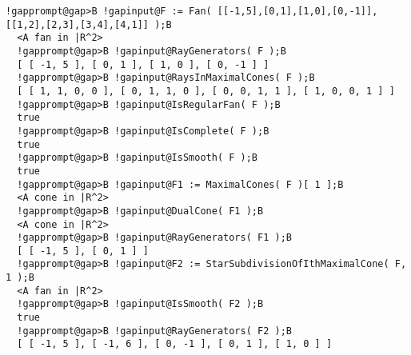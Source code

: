 \documentclass[a4paper,11pt]{report}
\begin{document}
{{{\begin{Verbatim}[commandchars=!@B,fontsize=\small,frame=single,label=Example]
  !gapprompt@gap>B !gapinput@F := Fan( [[-1,5],[0,1],[1,0],[0,-1]],[[1,2],[2,3],[3,4],[4,1]] );B
  <A fan in |R^2>
  !gapprompt@gap>B !gapinput@RayGenerators( F );B
  [ [ -1, 5 ], [ 0, 1 ], [ 1, 0 ], [ 0, -1 ] ]
  !gapprompt@gap>B !gapinput@RaysInMaximalCones( F );B
  [ [ 1, 1, 0, 0 ], [ 0, 1, 1, 0 ], [ 0, 0, 1, 1 ], [ 1, 0, 0, 1 ] ]
  !gapprompt@gap>B !gapinput@IsRegularFan( F );B
  true
  !gapprompt@gap>B !gapinput@IsComplete( F );B
  true
  !gapprompt@gap>B !gapinput@IsSmooth( F );B
  true
  !gapprompt@gap>B !gapinput@F1 := MaximalCones( F )[ 1 ];B
  <A cone in |R^2>
  !gapprompt@gap>B !gapinput@DualCone( F1 );B
  <A cone in |R^2>
  !gapprompt@gap>B !gapinput@RayGenerators( F1 );B
  [ [ -1, 5 ], [ 0, 1 ] ]
  !gapprompt@gap>B !gapinput@F2 := StarSubdivisionOfIthMaximalCone( F, 1 );B
  <A fan in |R^2>
  !gapprompt@gap>B !gapinput@IsSmooth( F2 );B
  true
  !gapprompt@gap>B !gapinput@RayGenerators( F2 );B
  [ [ -1, 5 ], [ -1, 6 ], [ 0, -1 ], [ 0, 1 ], [ 1, 0 ] ]
\end{Verbatim}
}

 }

  }

   
\end{document}
